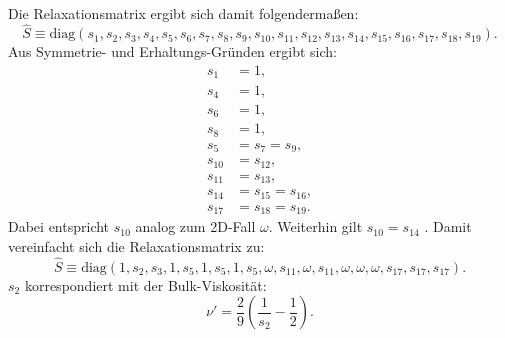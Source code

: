 \\
Die Relaxationsmatrix ergibt sich damit folgendermaßen:
\begin{equation}
 \hat{S} \equiv \text{diag} (s_1,s_2,s_3,s_4,s_5,s_6,s_7,s_8,s_9,s_{10},s_{11},s_{12},s_{13},s_{14},s_{15},s_{16},s_{17},s_{18},s_{19}) .
\end{equation}
Aus Symmetrie- und Erhaltungs-Gründen ergibt sich:
\begin{align}
s_1 &= 1 ,\\
s_4 &= 1 ,\\
s_6 &= 1 ,\\
s_8 &= 1 ,\\
s_5 &= s_7 = s_9 ,\\
s_{10} &= s_{12} ,\\
s_{11} &= s_{13} ,\\
s_{14} &= s_{15} = s_{16} ,\\
s_{17} &= s_{18} = s_{19} . 
\end{align}
Dabei entspricht $s_10$ analog zum 2D-Fall $\omega$. Weiterhin gilt $s_10 = s_{14}$ \cite{2002}. 
Damit vereinfacht sich die Relaxationsmatrix zu:
\begin{equation}
\hat{S} \equiv \text{diag} (1,s_2,s_3,1,s_5,1,s_5,1,s_5, \omega ,s_{11},\omega,s_{11},\omega,\omega,\omega,s_{17},s_{17},s_{17}) .
\end{equation}
$s_2$ korrespondiert mit der Bulk-Viskosität:
\begin{equation}
\nu' = \frac{2}{9} \left( \frac{1}{s_2} - \frac{1}{2} \right) .
\end{equation}